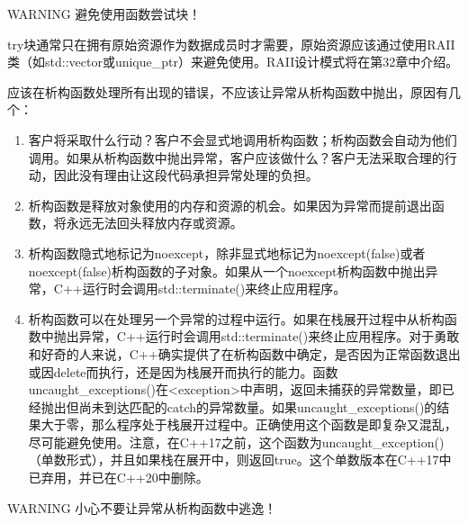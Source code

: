\begin{myWarning}{WARNING}
避免使用函数尝试块！

try块通常只在拥有原始资源作为数据成员时才需要，原始资源应该通过使用RAII类（如std::vector或unique\_ptr）来避免使用。RAII设计模式将在第32章中介绍。
\end{myWarning}


应该在析构函数处理所有出现的错误，不应该让异常从析构函数中抛出，原因有几个：

\begin{enumerate}
\item
客户将采取什么行动？客户不会显式地调用析构函数；析构函数会自动为他们调用。如果从析构函数中抛出异常，客户应该做什么？客户无法采取合理的行动，因此没有理由让这段代码承担异常处理的负担。

\item
析构函数是释放对象使用的内存和资源的机会。如果因为异常而提前退出函数，将永远无法回头释放内存或资源。

\item
析构函数隐式地标记为noexcept，除非显式地标记为noexcept(false)或者noexcept(false)析构函数的子对象。如果从一个noexcept析构函数中抛出异常，C++运行时会调用std::terminate()来终止应用程序。

\item
析构函数可以在处理另一个异常的过程中运行。如果在栈展开过程中从析构函数中抛出异常，C++运行时会调用std::terminate()来终止应用程序。对于勇敢和好奇的人来说，C++确实提供了在析构函数中确定，是否因为正常函数退出或因delete而执行，还是因为栈展开而执行的能力。函数uncaught\_exceptions()在<exception>中声明，返回未捕获的异常数量，即已经抛出但尚未到达匹配的catch的异常数量。如果uncaught\_exceptions()的结果大于零，那么程序处于栈展开过程中。正确使用这个函数是即复杂又混乱，尽可能避免使用。注意，在C++17之前，这个函数为uncaught\_exception()（单数形式），并且如果栈在展开中，则返回true。这个单数版本在C++17中已弃用，并已在C++20中删除。
\end{enumerate}

\begin{myWarning}{WARNING}
小心不要让异常从析构函数中逃逸！
\end{myWarning}

















